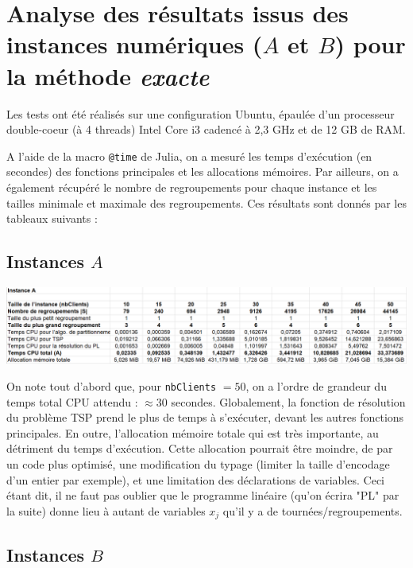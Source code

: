\documentclass[french, 11pt, a4paper]{article} %
\newcommand{\smb}{\smallbreak}
\begin{document}
\section{Analyse des résultats issus des instances numériques ($A$ et $B$) pour la méthode \emph{exacte}} 

Les tests ont été réalisés sur une configuration Ubuntu, épaulée d'un processeur double-coeur (à 4 threads) Intel Core i3 cadencé à 2,3 GHz et de 12 GB de RAM.

A l'aide de la macro \texttt{@time} de Julia, on a mesuré les temps d'exécution (en secondes) des fonctions principales et les allocations mémoires.
Par ailleurs, on a également récupéré le nombre de regroupements pour chaque instance et les tailles minimale et maximale des regroupements.
Ces résultats sont donnés par les tableaux suivants :

\subsection{Instances $A$}

\begin{center}
    \includegraphics[scale=0.50]{ResExacte_InstA.PNG}
\end{center}

    On note tout d'abord que, pour \verb+nbClients+ $=50$, on a l'ordre de grandeur du temps total CPU attendu : $\approx 30$ secondes.
    \smb Globalement, la fonction de résolution du problème TSP prend le plus de temps à s'exécuter, devant les autres fonctions principales.
    \smb En outre, l'allocation mémoire totale qui est très importante, au détriment du temps d'exécution.
Cette allocation pourrait être moindre, de par un code plus optimisé, une modification du typage (limiter la taille d'encodage d'un entier par exemple),
et une limitation des déclarations de variables. Ceci étant dit, il ne faut pas oublier que le programme linéaire (qu'on écrira "PL" par la suite)
donne lieu à autant de variables $x_j$ qu'il y a de tournées/regroupements. 

\subsection{Instances $B$}
\end{document}
